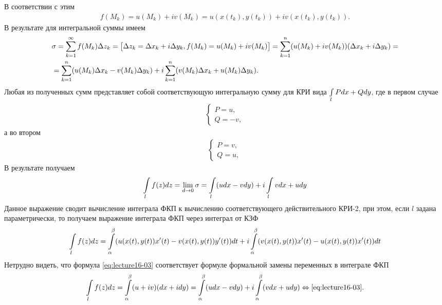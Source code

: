 В соответствии с этим
\begin{align*}
  f(M_k) = u(M_k) + iv(M_k) = u(x(t_k), y(t_k)) + iv(x(t_k), y(t_k)).
\end{align*}
В результате для интегральной суммы имеем
\begin{align*}
  &\sigma = \sum\limits_{k = 1}^{\infty}f(M_k)\Delta z_k = \left[\begin{matrix}\Delta z_k = \Delta x_k + i\Delta y_k,
    f(M_k) = u(M_k) + iv(M_k)\end{matrix}\right] =
  \sum\limits_{k = 1}^n(u(M_k) + iv(M_k))(\Delta x_k + i\Delta y_k) =\\
  &=\sum\limits_{k = 1}^n(u(M_k)\Delta x_k - v(M_k)\Delta y_k) +
  i\sum\limits_{k = 1}^n(v(M_k)\Delta x_k + u(M_k)\Delta y_k).
\end{align*}
Любая из полученных сумм представляет собой соответствующую интегральную сумму для КРИ вида
$\int\limits_lPdx + Qdy$, где в первом случае
\begin{align*}
  \begin{cases}
    P = u,\\
    Q = -v,
  \end{cases}
\end{align*}
а во втором
\begin{align*}
  \begin{cases}
    P = v,\\
    Q = u,
  \end{cases}
\end{align*}
В результате получаем
\begin{equation}
  \label{eq:lecture16-02}
  \int\limits_lf(z)dz = \lim\limits_{d \to 0}\sigma = \int\limits_l(udx - vdy) + i\int\limits_lvdx + udy
\end{equation}
Данное выражение сводит вычисление интеграла ФКП к вычислению соответствующего действительного КРИ-2,
при этом, если $l$ задана параметрически, то получаем выражение интеграла ФКП через интеграл от
КЗФ
\begin{equation}
  \label{eq:lecture16-03}
  \int\limits_lf(z)dz = \int\limits_{\alpha}^{\beta}(u(x(t), y(t))x'(t) - v(x(t), y(t))y'(t))dt +
  i\int\limits_{\alpha}^{\beta}(v(x(t), y(t))x'(t) - u(x(t), y(t))x'(t))dt
\end{equation}
Нетрудно видеть, что формула \eqref{eq:lecture16-03} соответствует формуле формальной замены
переменных в интеграле ФКП
\begin{align*}
  \int\limits_lf(z)dz = \int\limits_{\alpha}^{\beta}(u + iv)(dx + idy) = \int\limits_{\alpha}^{\beta}(udx - vdy) +
  i\int\limits_{\alpha}^{\beta}(vdx + udy) \Leftrightarrow \eqref{eq:lecture16-03}.
\end{align*}
